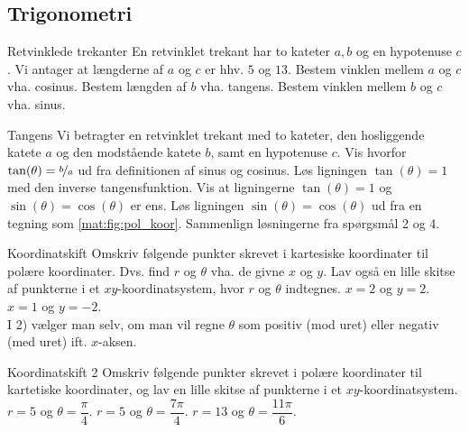 \subsection*{Trigonometri}
\begin{opgave}[1]{Retvinklede trekanter}
En retvinklet trekant har to kateter $a,b$ og en hypotenuse $c$. Vi antager at længderne af $a$ og $c$ er hhv. $5$ og $13$.
\opg Bestem vinklen mellem $a$ og $c$ vha. cosinus.
\opg Bestem længden af $b$ vha. tangens.
\opg Bestem vinklen mellem $b$ og $c$ vha. sinus.
\end{opgave}
\begin{opgave}[1]{Tangens}
Vi betragter en retvinklet trekant med to kateter, den hosliggende katete $a$ og den modstående katete $b$, samt en hypotenuse $c$.
\opg Vis hvorfor $\tan(\theta)=\nicefrac{b}{a}$ ud fra definitionen af sinus og cosinus.
\opg Løs ligningen $\tan(\theta)=1$ med den inverse tangensfunktion.
\opg Vis at ligningerne $\tan(\theta)=1$ og $\sin(\theta) = \cos(\theta)$ er ens.
\opg Løs ligningen $\sin(\theta) = \cos(\theta)$ ud fra en tegning som \cref{mat:fig:pol_koor}.
\opg Sammenlign løsningerne fra spørgsmål 2 og 4.
\end{opgave}
\begin{opgave}[1]{Koordinatskift}
Omskriv følgende punkter skrevet i kartesiske koordinater til polære koordinater. Dvs. find $r$ og $\theta$ vha. de givne $x$ og $y$. Lav også en lille skitse af punkterne i et $xy$-koordinatsystem, hvor $r$ og $\theta$ indtegnes.
\opg $x=2$ og $y=2$.
\opg $x=1$ og $y=-2$.\\
I 2) vælger man selv, om man vil regne $\theta$ som positiv (mod uret) eller negativ (med uret) ift. $x$-aksen.
\end{opgave}
\begin{opgave}[1]{Koordinatskift 2}
Omskriv følgende punkter skrevet i polære koordinater til kartetiske koordinater, og lav en lille skitse af punkterne i et $xy$-koordinatsystem.
\opg $r=5$ og $\theta=\dfrac{\pi}{4}$.
\opg $r=5$ og $\theta=\dfrac{7\pi}{4}$.
\opg $r=13$ og $\theta=\dfrac{11\pi}{6}$.
\end{opgave}
